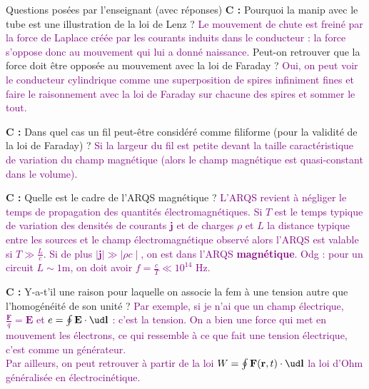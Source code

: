 \begin{reportBlock}{Questions posées par l’enseignant (avec réponses)}
  \textbf{C :} Pourquoi la manip avec le tube est une illustration de la loi de Lenz ? \textcolor{purple}{Le mouvement de chute est freiné par la force de Laplace créée par les courants induits dans le conducteur : la force s'oppose donc au mouvement qui lui a donné naissance.} Peut-on retrouver que la force doit être opposée au mouvement avec la loi de Faraday ? \textcolor{purple}{Oui, on peut voir le conducteur cylindrique comme une superposition de spires infiniment fines et faire le raisonnement avec la loi de Faraday sur chacune des spires et sommer le tout.}  \newline
  
  \textbf{C :} Dans quel cas un fil peut-être considéré comme filiforme (pour la validité de la loi de Faraday) ? \textcolor{purple}{Si la largeur du fil est petite devant la taille caractéristique de variation du champ magnétique (alors le champ magnétique est quasi-constant dans le volume).} \newline
  
  \textbf{C :} Quelle est le cadre de l'ARQS magnétique ? \textcolor{purple}{L'ARQS revient à négliger le temps de propagation des quantités électromagnétiques. Si $T$ est le temps typique de variation des densités de courants $\mathbf j$ et de charges $\rho$ et $L$ la distance typique entre les sources et le champ électromagnétique observé alors l'ARQS est valable si $T \gg \frac{L}{c}$. Si de plus $\mid \mathbf j \mid \gg \mid \rho c \mid$, on est dans l'ARQS \textbf{magnétique}. Odg : pour un circuit $L \sim 1$m, on doit avoir $f = \frac{c}{T} \ll 10^{14}$ Hz.} \newline
  
  \textbf{C :} Y-a-t'il une raison pour laquelle on associe la fem à une tension autre que l'homogénéité de son unité ? \textcolor{purple}{Par exemple, si je n'ai que un champ électrique, $\frac{\mathbf F}{q} = \mathbf E$ et $e = \oint \mathbf E \cdot \ud \mathbf l$ : c'est la tension. On a bien une force qui met en mouvement les électrons, ce qui ressemble à ce que fait une tension électrique, c'est comme un générateur. \\
  Par ailleurs, on peut retrouver à partir de la loi $W = \oint \mathbf{F}(\mathbf{r},t) \cdot \ud \mathbf l$ la loi d'Ohm généralisée en électrocinétique.} \newline
  

\end{reportBlock}
